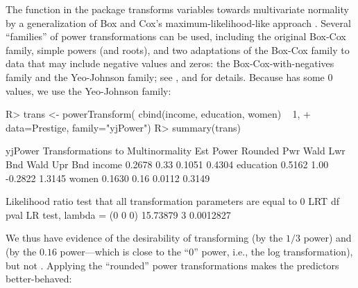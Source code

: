 \documentclass[
]{jss}
\begin{document}
The  function in the  package transforms
variables towards multivariate normality by a generalization of Box and
Cox's maximum-likelihood-like approach \citep{BoxCox:1964}. Several
``families'' of power transformations can be used, including the
original Box-Cox family, simple powers (and roots), and two adaptations
of the Box-Cox family to data that may include negative values and
zeros: the Box-Cox-with-negatives family and the Yeo-Johnson family; see
\citet[Chap. 8]{Weisberg:2014}, and \citet[Chap. 3]{FoxWeisberg:2019}
for details. Because  has some 0 values, we use the
Yeo-Johnson family:

\begin{CodeChunk}
\begin{CodeInput}
R> trans <- powerTransform( cbind(income, education, women) ~ 1,
+                          data=Prestige, family="yjPower")
R> summary(trans)
\end{CodeInput}
\begin{CodeOutput}
yjPower Transformations to Multinormality 
          Est Power Rounded Pwr Wald Lwr Bnd Wald Upr Bnd
income       0.2678        0.33       0.1051       0.4304
education    0.5162        1.00      -0.2822       1.3145
women        0.1630        0.16       0.0112       0.3149

 Likelihood ratio test that all transformation parameters are equal to 0
                               LRT df      pval
LR test, lambda = (0 0 0) 15.73879  3 0.0012827
\end{CodeOutput}
\end{CodeChunk}

We thus have evidence of the desirability of transforming 
(by the \(1/3\) power) and  (by the \(0.16\) power---which
is close to the ``0'' power, i.e., the log transformation), but not
. Applying the ``rounded'' power transformations makes
the predictors better-behaved:
\end{document}
